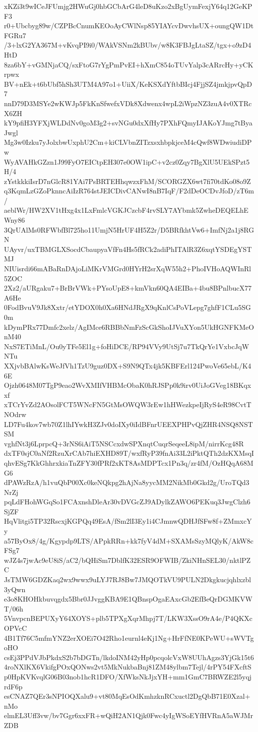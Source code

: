 xKZi3t9wICeJFUmjg2HWuGj0hbGCbArG4leD8uKzo2xBgUymFexjY64q12GeKPF3
r0+Ubcbyg89w/CZPBcCnumKEOoAyCWlNsp85YIAYcvDwvhsUX+oungQW1DtFGRu7
/3+lxG2YA367M+vKvqPI9i0/WAkVSNm2kBUbv/w8K3FBJgLtaSZ/tgx+o9zD4HtD
8za6bY+vGMNjaCQ/sxFtoG7rYgPmPvEI+hXmC854oTUvYalp3cARrcHy+yCKrpwx
BV+nEk+t6bUbf5hSh3UTM4A97o1+UiiX/KeKSXdYftbBIcj4FjjSZ4jmkjpvQpD7
nnD79D3MSYe2wKWJp5FkKnSfwefxVDk8Xdwenx4wpL2iWpzNZ3zuA4v0XTRcX6ZH
kY9pfiH3YFXjWLDdNv0goM3g2+svNGu0dxXfHy7PXhFQmyIJAKoYJmg7tByaJwgl
Mg3w0Izku7yJolxbwUxphU2Cm+kiCLVbnZITzxsxhbpkjceM4cQwf8WDwiudiDPw
WyAVAHkGZzn1J99FyO7EICtpEH307e0OW1ipC+v2cz0Zqy7BgXlU5UEkSPzt5H/4
zYstkkkiIsrD7nGlcR81YAi7PsBRTEHhqwzxFhM/SCORGZX6wt7fi70tdKo08o9Z
q3KqmLzGZoPknncAiIzR764stJEICDivCANwI8nB7IqF/F2dDeOCDvJfoD/zT6m/
aeblWr/HW2XV1tHxg4x1LxFmlcVGKJCzcbF4rvSLY7AYbmk5ZwheDEQELhEWny86
3QrUAlMs0RFWbfBl725ho11UmjN5HrUF4H5Z2r/D5BRfkhtVw6+ImfNj2a1j8RGN
UAyvr/uxTBMGLXSocdCbaupyaVfFn4Hs5fRCk2adiPhITAlR3Z6xqtYSDEgYSTMJ
NIUisrdi66mABaRnDAjoLiMKrVMGrd0HYrH2srXqW55h2+PhoIVHoAQWInRl5ZOC
2Xz2/aURgaku7+BrBrVWk+PYsoUpE8+kmVkn60QA4EIBa+4bu8BPnlbucX77A6He
0FodBvuV9Jk8Xxtr/etYDOX0h0Xa6HNdJRgX9qKnlCsPoVLepg7ghfF1CLu5SG0m
kDymPRx77Dmfc2xelz/AgIMce6RBBbNmFzScGkShoIJVuXYon5UkHGNFKMeOnM40
NxS7ETiMnL/Ou0yTFe5El1g+foHiDCE/RP94VVy9UtSj7u7TkQrYe1VxbcJqWNTu
XXjvbBAlwKsWeJfVh1TzU9guz0DX+S9N9QTx4jk5KBFErl124PwoVe65ebL/K46E
Ojzh0648M07TgP9eao2WvXMIfVHBMcObaK0hRJSPp0k9irv0UiJoGVeg18BKqxxf
xTCrYvZd2AOsolFCT5WNcFN5GtMsOWQW3rEw1hHWezkpeIjRyS4eR98CvtTNOdrw
LD7Fu4kov7wb70Z1lhIYwkH3ZJv0doIXy0iIdBFnrUEEXPHPvQjZHR4NSQ8NSTSM
vghfNt3j6LprpcQ+3rNS6iAiT5NSCcxdwSPXnqtCuqrSeqeeL8ipM/nirrKcg48R
dxTF0sjC0aNf2RzuXrCAb7hiEXHD89T/wxfRyP39fnAi33L2iPktQTh2dzKXMsqI
qhvESg7KkGhhrxkiaTnZFY30fPRf2xKT8AsMDPTcx1Pn3q/zr4fM/OzHQqA68MG6
dPAWzRzA/h1vuQbP00Xc0keNQkpg2hAjNa8yycMM2NikMb0Gkd2g/UroTQd3NrZj
pqLdFHohWGqSo1FCAxnshDleAr30vDVGcZJ9ADylkZAWO6PEKuq3JwgClzh6SjZF
HqVlitgi5TP32RscxjKGPQq49EsA/fSm2lI3Ey1i4CJmnwQDHJfSFw8f+ZMmxcYy
a57ByOx8/4g/Kgypdp9LTS/APpkRRn+kk7fyV4dM+SXAMsSzyMQlyK/AkW8cFSg7
wJZ4s7jwAc9eU8iS/aC2/bQHiSm7DblfK32ESR9OFWIB/ZkiNHnSEL30/nktlPZC
JsTMW6GDZKaq2wx9wwx9uLYJ7RJ8Bw7JMQOTkVU9PULN2Dkgkucjqhlxzbl3yQwn
e3o8KHOHkbuvqgdx5Bbr0JJvggKBA9E1QBnspOgaEAxcGb2EfBeQrDGMKVWT/06h
5VnvpcnBEPUXyY64XOYS+plb5TPXgXqrMhpj7T/LKW3XssO9rA4e/P4QKXcOPVcC
4B1Tf76C5mfmYNZ2erXOEi7O42Rho1eurnl4eKj1Ng+HrFfNE0KPeWU+sWVTgoHO
csEj3PPdVJbPkdxS2b7bDGTn/lkdoINM42yHp0pcqolcVxW8UUhAgzs3YjGk15t6
4roNXlKX6VkifgPOxQONws2vt5MkNukbaBnj81ZM48ylbm7Tejl/4rPY54FXcftS
p0HpKVKvqlG06B03nob1hcR1DFO/XfWksNkJjxYH+mm1GmC7BRWZE2l5yqjrdF6p
esCNAZ7QEr3sNPIOQXalu9+vt80MqEsOdKmhzknRCxuctl2DgQbB71E0Xzal+nMo
elmEL3Uff3vw/bv7Ggr6xxFR+wQiH2AN1Qjk0Fwc4yIgWSoEYfHVRnA5aWJMrZDB
